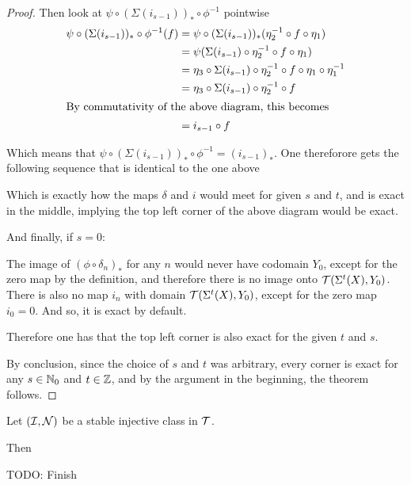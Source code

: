 \begin{proof}
    Then look at \( \psi \circ (\Sigma(i_{s-1}))_* \circ \phi^{-1} \) pointwise
    \begin{align*}
        \psi \circ (\Sigma(i_{s-1}))_* \circ \phi^{-1} ( f ) &= \psi \circ (\Sigma(i_{s-1}))_* ( \eta_2^{-1} \circ f \circ \eta_1 ) \\
        &= \psi ( \Sigma(i_{s - 1}) \circ \eta_2^{-1} \circ f \circ \eta_1 ) \\
        &= \eta_3 \circ \Sigma(i_{s - 1}) \circ \eta_2^{-1} \circ f \circ \eta_1 \circ \eta_1^{-1} \\
        &= \eta_3 \circ \Sigma(i_{s - 1}) \circ \eta_2^{-1} \circ f \\
        \intertext{By commutativity of the above diagram, this becomes}
        &= i_{s - 1} \circ f
    \end{align*}

    Which means that \( \psi \circ (\Sigma(i_{s-1}))_* \circ \phi^{-1} = ( i_{s - 1} )_* \). One thereforore gets the following sequence that is identical to the one above
    \begin{center}
    \end{center}
    Which is exactly how the maps \( \delta \) and \( i \) would meet for given \( s \) and \( t \), and is exact in the middle, implying the top left corner of the above diagram would be exact.

    And finally, if \( s = 0 \):

    The image of \( (\phi \circ \delta_n)_* \) for any \( n \) would never have codomain \( Y_0 \), except for the zero map by the definition, and therefore there is no image onto \( {\mathcal{T}}(\Sigma^t( X ), Y_0) \). There is also no map \( i_n \) with domain \( {\mathcal{T}}(\Sigma^t( X ), Y_0) \), except for the zero map \( i_0 = 0 \). And so, it is exact by default.

    Therefore one has that the top left corner is also exact for the given \( t \) and \( s \).

    By conclusion, since the choice of \( s \) and \( t \) was arbitrary, every corner is exact for any \( s \in {\mathbb{N}}_0 \) and \( t \in {\mathbb{Z}} \), and by the argument in the beginning, the theorem follows.
\end{proof}

\begin{definition}
    Let \( ({\mathcal{I}}, {\mathcal{N}}) \) be a stable injective class in \( {\mathcal{T}} \).

    Then

    TODO: Finish
\end{definition}
